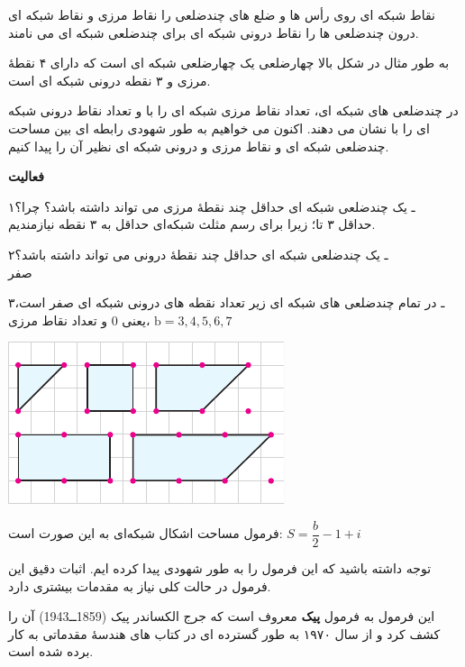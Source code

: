 \documentclass[12pt, a4paper]{book}
\begin{document}
نقاط شبکه ای روی رأس ها و ضلع های چندضلعی را نقاط مرزی و نقاط شبکه ای درون چندضلعی ها را نقاط درونی شبکه ای برای چندضلعی شبکه ای می نامند.

به طور مثال در شکل بالا چهارضلعی 
یک چهارضلعی شبکه ای است که دارای ۴ نقطهٔ مرزی و ٣ نقطه درونی شبکه ای است.
\bigskip

در چندضلعی های شبکه ای، تعداد نقاط مرزی شبکه ای را با
و تعداد نقاط درونی شبکه ای را با
نشان می دهند. اکنون می خواهیم به طور شهودی رابطه ای بین مساحت چندضلعی شبکه ای و نقاط مرزی و درونی شبکه ای نظیر آن را پیدا کنیم.
\bigskip

\textbf{فعالیت}

۱ـ یک چندضلعی شبکه ای حداقل چند نقطهٔ مرزی می تواند داشته باشد؟ چرا؟ \\
حداقل ۳ تا؛ زیرا برای رسم مثلث شبکه‌ای حداقل به ۳ نقطه نیازمندیم.




\begin{minipage}{0.68\textwidth}
	۲ـ یک چندضلعی شبکه ای حداقل چند نقطهٔ درونی می تواند داشته باشد؟ \\
	 صفر
	
	۳ـ در تمام چندضلعی های شبکه ای زیر تعداد نقطه های درونی شبکه ای صفر است، یعنی
	0
	و تعداد نقاط مرزی، 
	$\mbox{b} = 3 , 4, 5, 6 , 7$
\end{minipage}   
\begin{minipage}{.32\textwidth}
	\begin{flushleft}
		\includegraphics{"Shapes/Fasl - 3/Dars 2/P70-S1.pdf"}
	\end{flushleft}
\end{minipage}

فرمول مساحت اشکال شبکه‌ای به این صورت است:
$S = \dfrac{b}{2} -1 + i$

توجه داشته باشید که این فرمول را به طور شهودی پیدا کرده ایم. اثبات دقیق این فرمول در حالت کلی نیاز به مقدمات بیشتری دارد. 

این فرمول به فرمول \textbf{پیک} معروف است که جرج الکساندر پیک (1859ــ1943) آن را کشف کرد و از سال ۱۹۷۰ به طور گسترده ای در کتاب های هندسهٔ مقدماتی به کار برده شده است.
\end{document}
